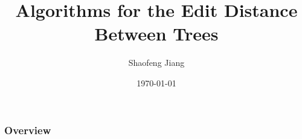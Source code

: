\documentclass{beamer}
\title[Trees Edit Distance]{Algorithms for the Edit Distance Between Trees} %
\author{Shaofeng Jiang} %
\institute[Western University] %
{
Western University \\ %
\medskip
\textit{sjian7@uwo.ca} %
}
\date{\today} %
\begin{document}
\begin{frame}
\titlepage %
\end{frame}

\begin{frame}
\frametitle{Overview} %
\begin{multicols}{2}
  \tableofcontents
\end{multicols}
\end{frame}


\end{document}
